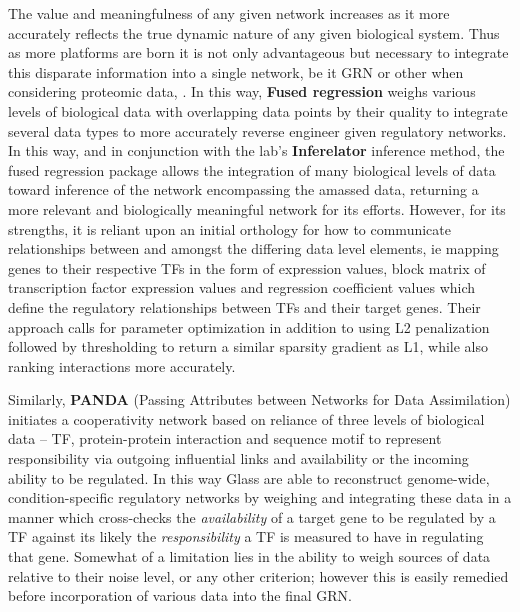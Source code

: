 The value and meaningfulness of any given network increases as it more accurately reflects the true dynamic nature of any given biological system. Thus as more platforms are born it is not only advantageous but necessary to integrate this disparate information into a single network, be it GRN or other when considering \eg proteomic data, \etc. In this way, \textbf{Fused regression} \cite{lam2016fused} weighs various levels of biological data with overlapping data points by their quality to integrate several data types to more accurately reverse engineer given regulatory networks. In this way, and in conjunction with the lab's \textbf{Inferelator}\cite{bonneau2006inferelator} inference method, the fused regression package allows the integration of many biological levels of data toward inference of the network encompassing the amassed data, returning a more relevant and biologically meaningful network for its efforts. However, for its strengths, it is reliant upon an initial orthology for how to communicate relationships between and amongst the differing data level elements, ie mapping genes to their respective TFs in the form of expression values, block matrix of transcription factor expression values and regression coefficient values which define the regulatory relationships between TFs and their target genes. Their approach  calls for parameter optimization in addition to using L2 penalization followed by thresholding to return a similar sparsity gradient as L1, while also ranking interactions more accurately.

Similarly, \textbf{PANDA} (Passing Attributes between Networks for Data Assimilation) \cite{glass2013passing} initiates a cooperativity network based on reliance of three levels of biological data -- TF, protein-protein interaction and sequence motif to represent responsibility via outgoing influential links and availability or the incoming ability to be regulated. In this way Glass \etal are able to reconstruct genome-wide, condition-specific regulatory networks by weighing and integrating these data in a manner which cross-checks the \emph{availability} of a target gene to be regulated by a TF against its likely the \emph{responsibility} a TF is measured to have in regulating that gene. Somewhat of a limitation lies in the ability to weigh sources of data relative to their noise level, or any other criterion; however this is easily remedied before incorporation of various data into the final GRN.

